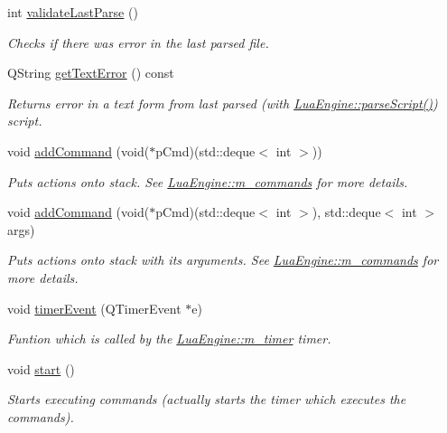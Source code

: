 \begin{DoxyCompactItemize}
int \hyperlink{class_lua_engine_aed08b6b1d8b4a637bb3e24a397ea1aaf}{validate\-Last\-Parse} ()
\begin{DoxyCompactList}\small\item\em Checks if there was error in the last parsed file. \end{DoxyCompactList}\item 
Q\-String \hyperlink{class_lua_engine_af06d49221c25b93c334f9ed49571fa72}{get\-Text\-Error} () const 
\begin{DoxyCompactList}\small\item\em Returns error in a text form from last parsed (with \hyperlink{class_lua_engine_a5eae05f78704166f098ea20568c23fd7}{Lua\-Engine\-::parse\-Script()}) script. \end{DoxyCompactList}\item 
void \hyperlink{class_lua_engine_abeccc6545aa5cde1681cf61780044ab3}{add\-Command} (void($\ast$p\-Cmd)(std\-::deque$<$ int $>$))
\begin{DoxyCompactList}\small\item\em Puts actions onto stack. See \hyperlink{class_lua_engine_a86a3f32127e36e1ccce6c5a42a298ad5}{Lua\-Engine\-::m\-\_\-commands} for more details. \end{DoxyCompactList}\item 
void \hyperlink{class_lua_engine_a1046fcf4498761e9c35165b99ca09987}{add\-Command} (void($\ast$p\-Cmd)(std\-::deque$<$ int $>$), std\-::deque$<$ int $>$ args)
\begin{DoxyCompactList}\small\item\em Puts actions onto stack with its arguments. See \hyperlink{class_lua_engine_a86a3f32127e36e1ccce6c5a42a298ad5}{Lua\-Engine\-::m\-\_\-commands} for more details. \end{DoxyCompactList}\item 
void \hyperlink{class_lua_engine_a021846fc7d821e449fa1ce8d96c7dbc9}{timer\-Event} (Q\-Timer\-Event $\ast$e)
\begin{DoxyCompactList}\small\item\em Funtion which is called by the \hyperlink{class_lua_engine_a367284a1461c5a2d2804c3f9b4d94f14}{Lua\-Engine\-::m\-\_\-timer} timer. \end{DoxyCompactList}\item 
void \hyperlink{class_lua_engine_a28e0795b54170d763a929256566fe2b5}{start} ()
\begin{DoxyCompactList}\small\item\em Starts executing commands (actually starts the timer which executes the commands). \end{DoxyCompactList}\item 

\end{DoxyCompactItemize}
